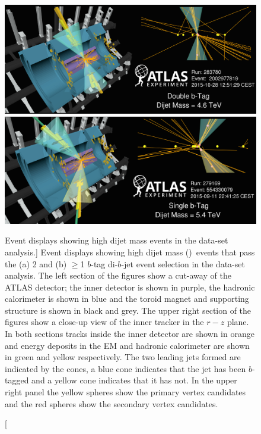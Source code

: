 \begin{figure}[!ht]
  \begin{center}
    \captionsetup[subfigure]{aboveskip=0pt,justification=centering}
        {\includegraphics[width=0.99\linewidth, angle=0]{figs/Dibjet/Gen/evt-vp1_bb_edit.png}\vspace{2mm} }\\
              {\includegraphics[width=0.99\linewidth, angle=0]{figs/Dibjet/Gen/evt-vp1_b.png}\vspace{2mm} }
  \end{center}
  \caption
      [Event displays showing high dijet mass events in the \summer{} data-set analysis.]
      {Event displays showing high dijet mass (\mjj{})~events that pass the (a) 2 and (b) $\geq$1 $b$-tag di-$b$-jet event selection in the \summer{} data-set analysis.
        The left section of the figures show a cut-away of the ATLAS detector;
        the inner detector is shown in purple, the hadronic calorimeter is shown in blue
        and the toroid magnet and supporting structure is shown in black and grey.
        The upper right section of the figures show a close-up view of the inner tracker in the $r-z$ plane.
        In both sections tracks inside the inner detector are shown in orange
        and energy deposits in the EM and hadronic calorimeter are shown in green and yellow respectively.
        The two leading jets formed are indicated by the cones, a blue cone indicates that the jet has been
        $b$-tagged and a yellow cone indicates that it has not.
        In the upper right panel the yellow spheres show the primary vertex candidates and the red spheres show the secondary vertex candidates.
      }
  \label{fig:evt-vp1}
\end{figure}


